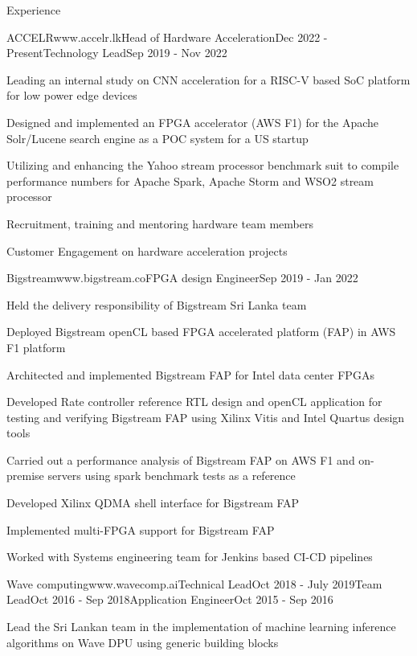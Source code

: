 \documentclass[
11pt, %
]{./../assets/resume} %
\begin{document}
\begin{rSection}{Experience}
	\begin{rSubsectionM}{ACCELR}{www.accelr.lk}{Head of Hardware Acceleration}{Dec 2022 - Present}{Technology Lead}{Sep 2019 - Nov 2022}{}{}
		\item Leading an internal study on CNN acceleration for a RISC-V based SoC platform for low power edge devices
		\item Designed and implemented an FPGA accelerator (AWS F1) for the Apache Solr/Lucene search engine as a POC system for a US startup
		\item Utilizing and enhancing the Yahoo stream processor benchmark suit to compile performance numbers for  Apache Spark, Apache Storm and WSO2 stream processor
		\item Recruitment, training and mentoring hardware team members
		\item Customer Engagement on hardware acceleration projects
	\end{rSubsectionM}
	\begin{rSubsectionX}{Bigstream}{www.bigstream.co}{FPGA design Engineer}{Sep 2019 - Jan 2022}
		\item Held the delivery responsibility of Bigstream Sri Lanka team
		\item Deployed Bigstream openCL based FPGA accelerated platform (FAP) in AWS F1 platform
		\item Architected and implemented Bigstream FAP for Intel data center FPGAs
		\item Developed Rate controller reference RTL design and openCL application for testing and verifying Bigstream FAP using Xilinx Vitis and Intel Quartus design tools
		\item Carried out a performance analysis of Bigstream FAP on AWS F1 and on-premise servers using spark benchmark tests as a reference
		\item Developed Xilinx QDMA shell interface for Bigstream FAP
		\item Implemented multi-FPGA support for Bigstream FAP
		\item Worked with Systems engineering team for Jenkins based CI-CD pipelines
	\end{rSubsectionX}
	\begin{rSubsectionM}{Wave computing}{www.wavecomp.ai}{Technical Lead}{Oct 2018 - July 2019}{Team Lead}{Oct 2016 - Sep 2018}{Application Engineer}{Oct 2015 - Sep 2016}
		\item Lead the Sri Lankan team in the implementation of machine learning inference algorithms on Wave DPU using generic building blocks

\end{rSubsectionM}
\end{rSection}
\end{document}
